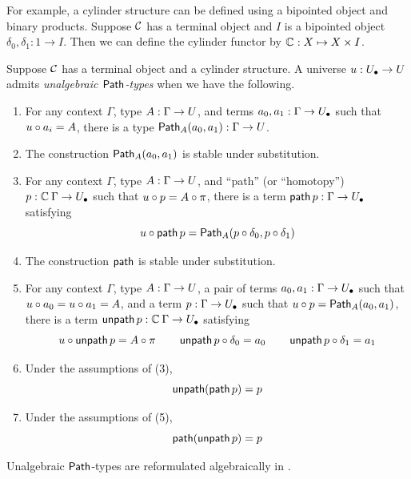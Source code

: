 For example, a cylinder structure can be defined
using a bipointed object and binary products.
Suppose $\mathcal{C}$ has a terminal object and $I$ is
a bipointed object $\delta_0, \delta_1 : 1 \to I$.
Then we can define the cylinder functor by $\mathop{\mathbb{C}_{}} : X \mapsto X \times I$.

\begin{definition}
  Suppose $\mathcal{C}$ has a terminal object and
  a cylinder structure.
  A universe ${u} : {U_\bullet} \to U$ admits
  \emph{unalgebraic $\mathop{\mathsf{Path}}$-types}
  when we have the following.
  \begin{enumerate}
  \item 
    For any context $\Gamma$, type $A : \Gamma \to U$,
    and terms $a_0, a_1 : \Gamma \to {U_\bullet}$ such that
    ${u} \circ a_i  = A$,
    there is a type $\mathop{\mathsf{Path}}_A (a_0,a_1) : \Gamma \to U$.
  \item
    The construction $\mathop{\mathsf{Path}}_A (a_0,a_1)$ is stable under substitution.
  \item
    For any context $\Gamma$, type $A : \Gamma \to U$,
    and ``path'' (or ``homotopy'') $p : \mathop{\mathbb{C}_{}} \Gamma \to {U_\bullet}$ such that
    ${u} \circ p = A \circ \pi$,
    there is a term $\mathop{\mathsf{path}}  p : \Gamma \to {U_\bullet}$
    satisfying
    \[{u} \circ \mathop{\mathsf{path}}  p  = {\mathop{\mathsf{Path}}}_A (p \circ \delta_0,p \circ \delta_1)\]
  \item The construction $\mathop{\mathsf{path}}$ is stable under substitution.
  \item
    For any context $\Gamma$, type $A : \Gamma \to U$,
    a pair of terms $a_0, a_1 : \Gamma \to {U_\bullet}$ such that
    ${u} \circ a_0 = {u} \circ a_1 = A$,
    and a term $p : \Gamma \to {U_\bullet}$ such that
    ${u} \circ p = \mathop{\mathsf{Path}}_A (a_0,a_1)$,
    there is a term $\mathop{\mathsf{unpath}}  p : \mathop{\mathbb{C}_{}} \Gamma \to {U_\bullet}$
    satisfying
    \[{u} \circ \mathop{\mathsf{unpath}}  p = A \circ \pi
      \quad \quad
      \mathop{\mathsf{unpath}} p \circ \delta_0  = a_0
      \quad \quad
      \mathop{\mathsf{unpath}} p \circ \delta_1  = a_1
    \]
  \item Under the assumptions of (3),
    \[ \mathop{\mathsf{unpath}} (\mathop{\mathsf{path}} p) = p \]
  \item Under the assumptions of (5),
    \[ \mathop{\mathsf{path}} (\mathop{\mathsf{unpath}} p) = p \]
  \end{enumerate}
\end{definition}

Unalgebraic $\mathop{\mathsf{Path}}$-types are reformulated algebraically in
.

